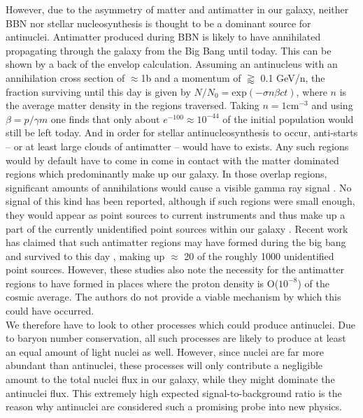 However, due to the asymmetry of matter and antimatter in our galaxy, neither BBN nor stellar nucleosynthesis is thought to be a dominant source for antinuclei. Antimatter produced during BBN is likely to have annihilated propagating through the galaxy from the Big Bang until today. This can be shown by a back of the envelop calculation. Assuming an antinucleus with an annihilation cross section of $\approx$1b and a momentum of $\gtrapprox$ 0.1 GeV/n, the fraction surviving until this day is given by $N/N_0 = \mathrm{exp}(-\sigma n \beta c t)$, where $n$ is the average matter density in the regions traversed. Taking $n = 1 \mathrm{cm}^{-3}$ and using $\beta = p/\gamma m$ one finds that only about $e^{-100} \approx 10^{-44}$ of the initial population would still be left today.  And in order for stellar antinucleosynthesis to occur, anti-starts -- or at least large clouds of antimatter -- would have to exists. Any such regions would by default have to come in come in contact with the matter dominated regions which predominantly make up our galaxy. In those overlap regions, significant amounts of annihilations would cause a visible gamma ray signal \cite{Poulin_AMS_ahe_events}.  No signal of this kind has been reported, although if such regions were small enough, they would appear as point sources to current instruments and thus make up a part of the currently unidentified point sources within our galaxy \cite{FermiLAT_Point_Sources}. Recent work has claimed that such antimatter regions may have formed during the big bang and survived to this day \cite{DM_gamma_rays, Gamma_DM_searches}, making up $\approx$ 20 of the roughly 1000 unidentified point sources. However, these studies also note the necessity for the antimatter regions to have formed in places where the proton density is O($10^{-8}$) of the cosmic average.  The authors do not provide a viable mechanism by which this could have occurred. \\
We therefore have to look to other processes which could produce antinuclei. Due to baryon number conservation, all such processes are likely to produce at least an equal amount of light nuclei as well. However, since nuclei are far more abundant than antinuclei, these processes will only contribute a negligible amount to the total nuclei flux in our galaxy, while they might dominate the antinuclei flux. This extremely high expected signal-to-background ratio is the reason why antinuclei are considered such a promising probe into new physics.

